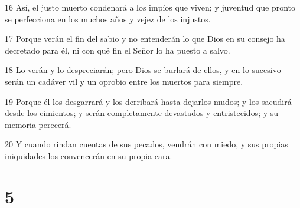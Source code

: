 \par 16 Así, el justo muerto condenará a los impíos que viven; y juventud que pronto se perfecciona en los muchos años y vejez de los injustos.
\par 17 Porque verán el fin del sabio y no entenderán lo que Dios en su consejo ha decretado para él, ni con qué fin el Señor lo ha puesto a salvo.
\par 18 Lo verán y lo despreciarán; pero Dios se burlará de ellos, y en lo sucesivo serán un cadáver vil y un oprobio entre los muertos para siempre.
\par 19 Porque él los desgarrará y los derribará hasta dejarlos mudos; y los sacudirá desde los cimientos; y serán completamente devastados y entristecidos; y su memoria perecerá.
\par 20 Y cuando rindan cuentas de sus pecados, vendrán con miedo, y sus propias iniquidades los convencerán en su propia cara.

\chapter{5}

